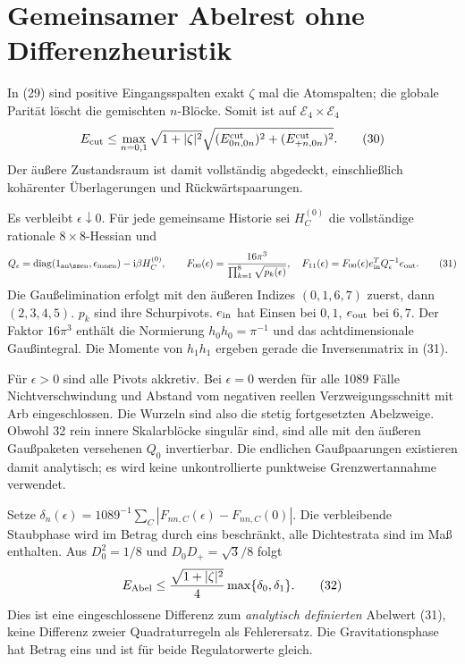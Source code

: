 \documentclass[10pt,a4paper]{article}
\begin{document}
\section{Gemeinsamer Abelrest ohne Differenzheuristik}
In (29) sind positive Eingangsspalten exakt $\zeta$ mal die Atomspalten;
die globale Parität löscht die gemischten $n$-Blöcke. Somit ist auf
$\mathcal E_4\times\mathcal E_4$
\[
 E_{\rm cut}\le\max_{n=0,1}\sqrt{1+|\zeta|^2}
 \sqrt{(E^{\rm cut}_{0n,0n})^2+(E^{\rm cut}_{+n,0n})^2}.    \tag{30}
\]
Der äußere Zustandsraum ist damit vollständig abgedeckt, einschließlich
kohärenter Überlagerungen und Rückwärtspaarungen.

Es verbleibt $\epsilon\downarrow0$. Für jede gemeinsame Historie sei
$H^{(0)}_C$ die vollständige rationale $8\times8$-Hessian und
\[
 Q_\epsilon=\operatorname{diag}(1_{\rm außen},\epsilon_{\rm innen})
              -\ii\beta H_C^{(0)},\qquad
 F_{00}(\epsilon)=\frac{16\pi^3}{\prod_{k=1}^8\sqrt{p_k(\epsilon)}},\quad
 F_{11}(\epsilon)=F_{00}(\epsilon)e_{\rm in}^TQ_\epsilon^{-1}e_{\rm out}.
                                                                  \tag{31}
\]
Die Gaußelimination erfolgt mit den äußeren Indizes $(0,1,6,7)$ zuerst,
dann $(2,3,4,5)$. $p_k$ sind ihre Schurpivots. $e_{\rm in}$ hat Einsen
bei $0,1$, $e_{\rm out}$ bei $6,7$. Der Faktor $16\pi^3$ enthält die
Normierung $h_0h_0=\pi^{-1}$ und das achtdimensionale Gaußintegral.
Die Momente von $h_1h_1$ ergeben gerade die Inversenmatrix in (31).

Für $\epsilon>0$ sind alle Pivots akkretiv. Bei $\epsilon=0$ werden für
alle 1089 Fälle Nichtverschwindung und Abstand vom negativen reellen
Verzweigungsschnitt mit Arb eingeschlossen. Die Wurzeln sind also die
stetig fortgesetzten Abelzweige. Obwohl 32 rein innere Skalarblöcke singulär
sind, sind alle mit den äußeren Gaußpaketen versehenen $Q_0$ invertierbar.
Die endlichen Gaußpaarungen existieren damit analytisch; es wird keine
unkontrollierte punktweise Grenzwertannahme verwendet.

Setze $\delta_n(\epsilon)=1089^{-1}\sum_C|F_{nn,C}(\epsilon)-F_{nn,C}(0)|$.
Die verbleibende Staubphase wird im Betrag durch eins beschränkt, alle
Dichtestrata sind im Maß enthalten. Aus $D_0^2=1/8$ und
$D_0D_+=\sqrt3/8$ folgt
\[
 E_{\rm Abel}\le\frac{\sqrt{1+|\zeta|^2}}4
                         \max\{\delta_0,\delta_1\}.       \tag{32}
\]
Dies ist eine eingeschlossene Differenz zum \emph{analytisch definierten}
Abelwert (31), keine Differenz zweier Quadraturregeln als Fehlerersatz.
Die Gravitationsphase hat Betrag eins und ist für beide Regulatorwerte gleich.
\end{document}
